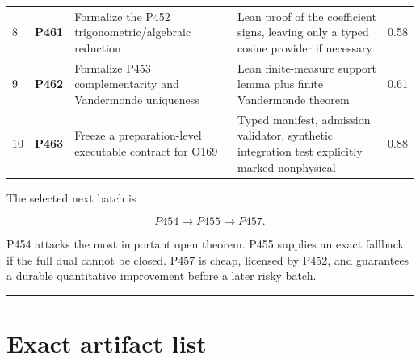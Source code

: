\documentclass[11pt,a4paper,openany]{report}
\begin{document}
\begin{center}
\begin{longtable}{@{}p{}p{}p{}p{}p{}@{}}
8 & \textbf{P461} & Formalize the P452 trigonometric/\allowbreak{}algebraic reduction & Lean proof of the coefficient signs, leaving only a typed cosine provider if necessary & 0.58 \\
9 & \textbf{P462} & Formalize P453 complementarity and Vandermonde uniqueness & Lean finite-measure support lemma plus finite Vandermonde theorem & 0.61 \\
10 & \textbf{P463} & Freeze a preparation-level executable contract for O169 & Typed manifest, admission validator, synthetic integration test explicitly marked nonphysical & 0.88 \\
\bottomrule
\end{longtable}
\endgroup
\end{center}

The selected next batch is

\[
\boxed{P454\longrightarrow P455\longrightarrow P457}.
\]

P454 attacks the most important open theorem. P455 supplies an exact fallback if the full dual cannot be closed. P457 is cheap, licensed by P452, and guarantees a durable quantitative improvement before a later risky batch.

\par\medskip\hrule\medskip

\chapter{Exact artifact list}
\end{document}

